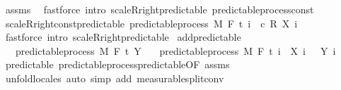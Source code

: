 \begin{isabellebody}
\endisadelimproof
%
\isatagproof
{}\isamarkupfalse%
\ assms\ \isamarkupfalse%
\ {\isacharparenleft}{\kern0pt}fastforce\ intro{\isacharcolon}{\kern0pt}\ scaleR{\isacharunderscore}{\kern0pt}right{\isacharunderscore}{\kern0pt}predictable\ predictable{\isacharunderscore}{\kern0pt}process{\isacharunderscore}{\kern0pt}const{\isacharparenright}{\kern0pt}%
\endisatagproof
{\isafoldproof}%
%
\isadelimproof
\isanewline
%
\endisadelimproof
\isanewline
{}\isamarkupfalse%
\ scaleR{\isacharunderscore}{\kern0pt}right{\isacharunderscore}{\kern0pt}const{\isacharprime}{\kern0pt}{\isacharunderscore}{\kern0pt}predictable{\isacharcolon}{\kern0pt}\ {\isachardoublequoteopen}predictable{\isacharunderscore}{\kern0pt}process\ M\ F\ t\ {\isacharparenleft}{\kern0pt}{\isasymlambda}i\ {\isasymxi}{\isachardot}{\kern0pt}\ c\ {\isacharasterisk}{\kern0pt}\isactrlsub R\ {\isacharparenleft}{\kern0pt}X\ i\ {\isasymxi}{\isacharparenright}{\kern0pt}{\isacharparenright}{\kern0pt}{\isachardoublequoteclose}\ \isanewline
%
\isadelimproof
\ \ %
\endisadelimproof
%
\isatagproof
{}\isamarkupfalse%
\ {\isacharparenleft}{\kern0pt}fastforce\ intro{\isacharcolon}{\kern0pt}\ scaleR{\isacharunderscore}{\kern0pt}right{\isacharunderscore}{\kern0pt}predictable{\isacharparenright}{\kern0pt}%
\endisatagproof
{\isafoldproof}%
%
\isadelimproof
\isanewline
%
\endisadelimproof
\isanewline
{}\isamarkupfalse%
\ add{\isacharunderscore}{\kern0pt}predictable{\isacharcolon}{\kern0pt}\isanewline
\ \ \ {\isachardoublequoteopen}predictable{\isacharunderscore}{\kern0pt}process\ M\ F\ t\ Y{\isachardoublequoteclose}\isanewline
\ \ \ {\isachardoublequoteopen}predictable{\isacharunderscore}{\kern0pt}process\ M\ F\ t\ {\isacharparenleft}{\kern0pt}{\isasymlambda}i\ {\isasymxi}{\isachardot}{\kern0pt}\ X\ i\ {\isasymxi}\ {\isacharplus}{\kern0pt}\ Y\ i\ {\isasymxi}{\isacharparenright}{\kern0pt}{\isachardoublequoteclose}\isanewline
%
\isadelimproof
\ \ %
\endisadelimproof
%
\isatagproof
{}\isamarkupfalse%
\ predictable\ predictable{\isacharunderscore}{\kern0pt}process{\isachardot}{\kern0pt}predictable{\isacharbrackleft}{\kern0pt}OF\ assms{\isacharbrackright}{\kern0pt}\ \isamarkupfalse%
\ {\isacharparenleft}{\kern0pt}unfold{\isacharunderscore}{\kern0pt}locales{\isacharparenright}{\kern0pt}\ {\isacharparenleft}{\kern0pt}auto\ simp\ add{\isacharcolon}{\kern0pt}\ measurable{\isacharunderscore}{\kern0pt}split{\isacharunderscore}{\kern0pt}conv{\isacharparenright}{\kern0pt}%

\end{isabellebody}
